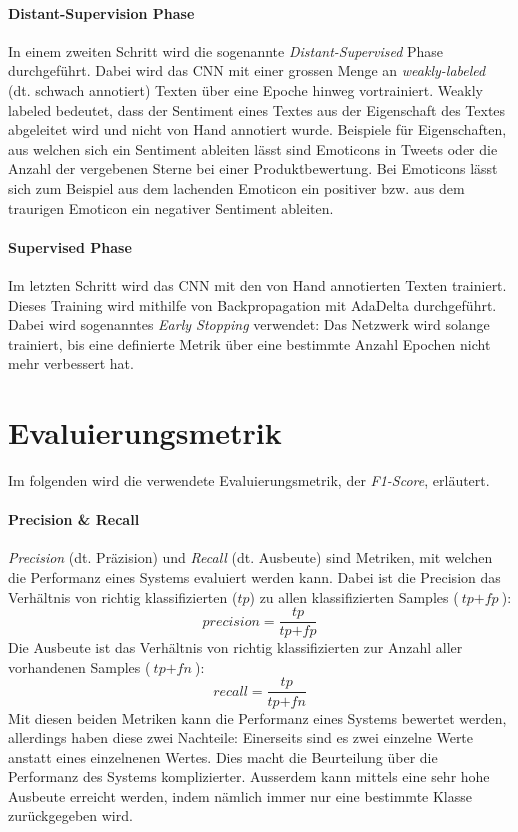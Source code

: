 \paragraph{Distant-Supervision Phase} In einem zweiten Schritt wird die sogenannte \emph{Distant-Supervised} Phase durchgeführt. Dabei wird das CNN mit einer grossen Menge an \emph{weakly-labeled} (dt. schwach annotiert) Texten über eine Epoche hinweg vortrainiert. Weakly labeled bedeutet, dass der Sentiment eines Textes aus der Eigenschaft des Textes abgeleitet wird und nicht von Hand annotiert wurde. Beispiele für Eigenschaften, aus welchen sich ein Sentiment ableiten lässt sind Emoticons in Tweets oder die Anzahl der vergebenen Sterne bei einer Produktbewertung. Bei Emoticons lässt sich zum Beispiel aus dem lachenden Emoticon \quotes{:-)} ein positiver bzw. aus dem traurigen Emoticon \quotes{:-(} ein negativer Sentiment ableiten.

\paragraph{Supervised Phase} Im letzten Schritt wird das CNN mit den von Hand annotierten Texten trainiert. Dieses Training wird mithilfe von Backpropagation mit AdaDelta durchgeführt. Dabei wird sogenanntes \emph{Early Stopping} verwendet: Das Netzwerk wird solange trainiert, bis eine definierte Metrik über eine bestimmte Anzahl Epochen nicht mehr verbessert hat.

\section{Evaluierungsmetrik}
Im folgenden wird die verwendete Evaluierungsmetrik, der \emph{F1-Score}, erläutert.

\paragraph{Precision {\&} Recall} \emph{Precision} (dt. Präzision) und \emph{Recall} (dt. Ausbeute) sind Metriken, mit welchen die Performanz eines Systems evaluiert werden kann. Dabei ist die Precision das Verhältnis von richtig klassifizierten ($\textit{tp}$) zu allen klassifizierten Samples ($\textit{tp} + \textit{fp}$):
\begin{equation}
\textit{precision} = \frac{\textit{tp}}{\textit{tp} + \textit{fp}}
\end{equation}
Die Ausbeute ist das Verhältnis von richtig klassifizierten zur Anzahl aller vorhandenen Samples ($\textit{tp} + \textit{fn}$):
\begin{equation}
recall = \frac{\textit{tp}}{\textit{tp} + \textit{fn}}
\end{equation}
Mit diesen beiden Metriken kann die Performanz eines Systems bewertet werden, allerdings haben diese zwei Nachteile: Einerseits sind es zwei einzelne Werte anstatt eines einzelnenen Wertes. Dies macht die Beurteilung über die Performanz des Systems komplizierter. Ausserdem kann mittels  eine sehr hohe Ausbeute erreicht werden, indem nämlich immer nur eine bestimmte Klasse zurückgegeben wird.
